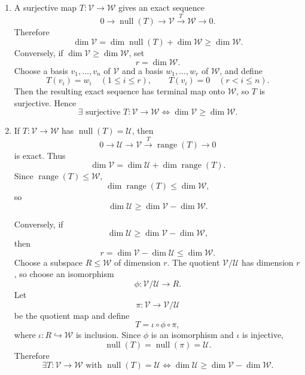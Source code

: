 \documentclass[12pt]{article}
\newcommand{\V}{\mathcal{V}}
\newcommand{\W}{\mathcal{W}}
\newcommand{\U}{\mathcal{U}}
\newcommand{\Null}{\operatorname{null}}
\newcommand{\Range}{\operatorname{range}}
\begin{document}
\begin{enumerate}[label=(\alph*)]
  \item A surjective map $T:\V\to\W$ gives an exact sequence
  \[
  0\to\Null(T)\to\V\xrightarrow{T}\W\to0.
  \]
  Therefore
  \[
  \dim\V=\dim\Null(T)+\dim\W\ge\dim\W.
  \]
  Conversely, if $\dim\V\ge\dim\W$, set
  \[
  r=\dim\W.
  \]
  Choose a basis $v_1,\ldots,v_n$ of $\V$ and a basis $w_1,\ldots,w_r$ of $\W$, and define
  \[
  T(v_i)=w_i\quad(1\le i\le r),
  \qquad
  T(v_i)=0\quad(r<i\le n).
  \]
  Then the resulting exact sequence has terminal map onto $\W$, so $T$ is surjective. Hence
  \[
  \boxed{\exists\text{ surjective }T:\V\to\W\iff \dim\V\ge\dim\W.}
  \]

  \item If $T:\V\to\W$ has $\Null(T)=\U$, then
  \[
  0\to\U\to\V\xrightarrow{T}\Range(T)\to0
  \]
  is exact. Thus
  \[
  \dim\V=\dim\U+
  \dim\Range(T).
  \]
  Since $\Range(T)\le\W$,
  \[
  \dim\Range(T)\le\dim\W,
  \]
  so
  \[
  \dim\U\ge\dim\V-
  \dim\W.
  \]

  Conversely, if
  \[
  \dim\U\ge\dim\V-
  \dim\W,
  \]
  then
  \[
  r=\dim\V-
  \dim\U\le\dim\W.
  \]
  Choose a subspace $R\le\W$ of dimension $r$. The quotient $\V/\U$ has dimension $r$, so choose an isomorphism
  \[
  \phi:\V/\U\to R.
  \]
  Let
  \[
  \pi:\V\to\V/\U
  \]
  be the quotient map and define
  \[
  T=\iota\circ\phi\circ\pi,
  \]
  where $\iota:R\hookrightarrow\W$ is inclusion. Since $\phi$ is an isomorphism and $\iota$ is injective,
  \[
  \Null(T)=\Null(\pi)=\U.
  \]
  Therefore
  \[
  \boxed{\exists T:\V\to\W\text{ with }\Null(T)=\U
  \iff
  \dim\U\ge\dim\V-
  \dim\W.}
  \]
\end{enumerate}

\bigskip
\end{document}
